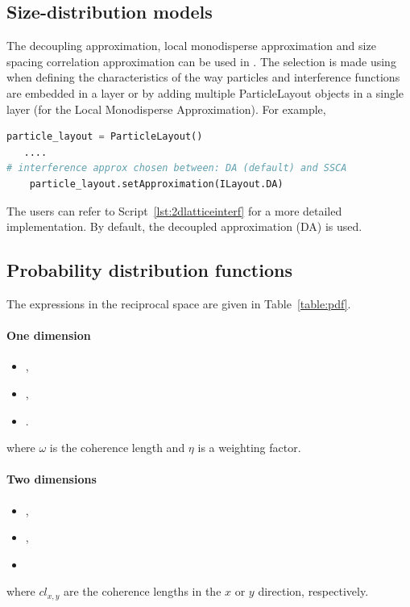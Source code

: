 \subsection{Size-distribution models}
The decoupling approximation, local monodisperse approximation and size spacing correlation approximation can be used in \BornAgain.
The selection is made using\\  when defining the characteristics of the way particles and interference functions are embedded in a layer or by adding multiple ParticleLayout objects in a single layer (for the Local Monodisperse Approximation).  For example,
\begin{lstlisting}[language=python, style=eclipseboxed,numbers=none,nolol]
    particle_layout = ParticleLayout()
   ....
# interference approx chosen between: DA (default) and SSCA
    particle_layout.setApproximation(ILayout.DA)
\end{lstlisting}

The users can refer to Script~\ref{lst:2dlatticeinterf} for a more detailed implementation. By default, the decoupled approximation (DA) is used.

\subsection{Probability distribution functions}\label{baftd}
The expressions in the reciprocal space are given in Table~\ref{table:pdf}.

\paragraph{One dimension}
\begin{itemize}
\item {},
\item {},
\item {}.
\end{itemize}
where $\omega$ is the coherence length and $\eta$ is a weighting factor.

\paragraph{Two dimensions}

\begin{itemize}
\item {},
\item {},
\item {}
\end{itemize}
where $cl_{x,y}$ are the coherence lengths in the $x$ or $y$ direction, respectively.

